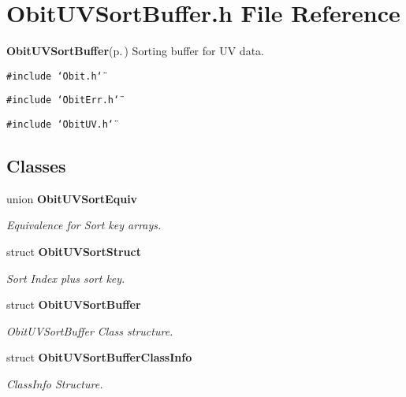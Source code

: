 \section{Obit\-UVSort\-Buffer.h File Reference}
\label{ObitUVSortBuffer_8h}
{\bf Obit\-UVSort\-Buffer}{\rm (p.\,\pageref{structObitUVSortBuffer})} Sorting buffer for UV data. 

{\tt \#include \char`\"{}Obit.h\char`\"{}}\par
{\tt \#include \char`\"{}Obit\-Err.h\char`\"{}}\par
{\tt \#include \char`\"{}Obit\-UV.h\char`\"{}}\par
\subsection*{Classes}
\begin{CompactItemize}
\item 
union {\bf Obit\-UVSort\-Equiv}
\begin{CompactList}\small\item\em Equivalence for Sort key arrays. \item\end{CompactList}\item 
struct {\bf Obit\-UVSort\-Struct}
\begin{CompactList}\small\item\em Sort Index plus sort key. \item\end{CompactList}\item 
struct {\bf Obit\-UVSort\-Buffer}
\begin{CompactList}\small\item\em Obit\-UVSort\-Buffer Class structure. \item\end{CompactList}\item 
struct {\bf Obit\-UVSort\-Buffer\-Class\-Info}
\begin{CompactList}\small\item\em Class\-Info Structure. \item\end{CompactList}\end{CompactItemize}
